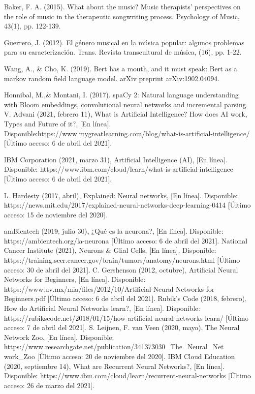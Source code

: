 \documentclass[12pt, a4paper, titlepage]{report}
\begin{document}
\begin{thebibliography}{20}
	Baker, F. A. (2015). What about the music? Music therapists’ perspectives on the role of music in the therapeutic songwriting process. Psychology of Music, 43(1), pp. 122-139.
	
	Guerrero, J. (2012). El género musical en la música popular: algunos problemas para su caracterización. Trans. Revista transcultural de música, (16), pp. 1-22.
	
	Wang, A., \& Cho, K. (2019). Bert has a mouth, and it must speak: Bert as a markov random field language model. arXiv preprint arXiv:1902.04094.
	
	Honnibal, M.,\& Montani, I. (2017). spaCy 2: Natural language understanding with Bloom embeddings, convolutional neural networks and incremental parsing.
	V. Advani (2021, febrero 11), What is Artificial Intelligence? How does AI work, Types and Future of it?, [En línea]. Disponible:https://www.mygreatlearning.com/blog/what-is-artificial-intelligence/ [Último acceso: 6 de abril del 2021].
	
	IBM Corporation (2021, marzo 31), Artificial Intelligence (AI), [En línea]. Disponible: https://www.ibm.com/cloud/learn/what-is-artificial-intelligence [Último acceso: 6 de abril del 2021].
	
	L. Hardesty (2017, abril), Explained: Neural networks, [En línea]. Disponible: https://news.mit.edu/2017/explained-neural-networks-deep-learning-0414 [Último acceso: 15 de noviembre del 2020].	
	
	amBientech (2019, julio 30), ¿Qué es la neurona?, [En línea]. Disponible: https://ambientech.org/la-neurona [Último acceso: 6 de abril del 2021].
	National Cancer Institute (2021), Neurons \& Glial Cells, [En línea]. Disponible: https://training.seer.cancer.gov/brain/tumors/anatomy/neurons.html [Último acceso: 30 de abril del 2021].	
	C. Gershenson (2012, octubre), Artificial Neural Networks for Beginners, [En línea]. Disponible: https://www.uv.mx/mia/files/2012/10/Artificial-Neural-Networks-for-Beginners.pdf [Último acceso: 6 de abril del 2021].
	Rubik's Code (2018, febrero), How do Artificial Neural Networks learn?, [En línea]. Disponible: https://rubikscode.net/2018/01/15/how-artificial-neural-networks-learn/ [Último acceso: 7 de abril del 2021].	
	S. Leijnen, F. van Veen (2020, mayo), The Neural Network Zoo, [En línea]. Disponible: https://www.researchgate.net/publication/341373030\_The\_Neural\_Net\\work\_Zoo [Último acceso: 20 de noviembre del 2020].
	IBM Cloud Education (2020, septiembre 14), What are Recurrent Neural Networks?, [En línea]. Disponible: https://www.ibm.com/cloud/learn/recurrent-neural-networks [Último acceso: 26 de marzo del 2021].
	

\end{thebibliography}
\end{document}
